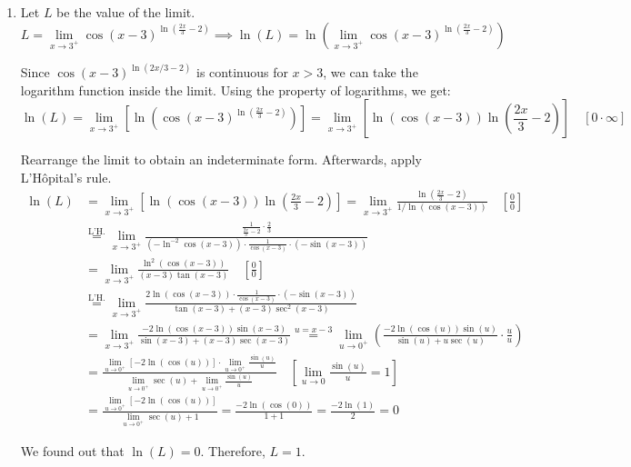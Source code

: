 \documentclass[a4paper, 12pt]{article}
\begin{document}
\begin{enumerate}[leftmargin=*,label=\textbf{\arabic*.}]
\item Let $L$ be the value of the limit.
\[L = \lim_{x\to3^+}\cos(x-3)^{\ln\left(\frac{2x}{3}-2\right)}\implies\ln(L) =\ln\left( \lim_{x\to3^+}\cos(x-3)^{\ln\left(\frac{2x}{3}-2\right)}\right)\]

Since $\cos(x-3)^{\ln(2x/3 -2)}$ is continuous for $x>3$, we can take the logarithm function inside the limit. Using the property of logarithms, we get:
\[\ln(L) =\lim_{x\to3^+}\left[ \ln\left(\cos(x-3)^{\ln\left(\frac{2x}{3}-2\right)}\right)\right] = \lim_{x\to3^+}\left[ \ln\left(\cos(x-3)\right)\ln\left(\frac{2x}{3}-2\right)\right]\quad[0 \cdot \infty]\]

Rearrange the limit to obtain an indeterminate form. Afterwards, apply L'Hôpital's rule.
\begin{align*}\ln(L)&=\lim_{x\to3^+}\left[ \ln\left(\cos(x-3)\right)\ln\left(\frac{2x}{3}-2\right)\right] = \lim_{x\to3^+}\frac{\ln\left(\frac{2x}{3}-2\right)}{1/ \ln\left(\cos(x-3)\right)} \quad \left[\frac00\right] \\[1em]&\overset{\text{L'H.}}{=} \lim_{x\to3^+}\frac{\displaystyle\frac1{\frac{2x}{3} - 2}\cdot \frac{2}{3}}{\displaystyle \left(-\ln^{-2}\displaystyle \cos(x-3)\right)\cdot \frac{1}{\cos(x-3)}\cdot(-\sin(x-3))}\\[1em]&= \lim_{x\to3^+} \displaystyle\frac{\ln^2(\cos(x-3))}{(x-3)\tan(x-3)} \quad\left[\frac00\right]\\[1em]&\overset{\text{L'H.}}{=} \lim_{x\to3^+} \frac{\displaystyle2\ln(\cos(x-3))\cdot\frac{1}{\cos(x-3)}\cdot(-\sin(x-3))}{\tan(x-3) + (x-3)\sec^2(x-3)}\\[1em]&=\lim_{x\to3^+}\frac{\displaystyle-2\ln(\cos(x-3))\sin(x-3)}{\sin(x-3) + (x-3)\sec(x-3)} \overset{u=x-3}{=} \lim_{u\to0^+}\left(\frac{\displaystyle-2\ln(\cos(u))\sin(u)}{\sin(u) + u\sec(u)} \cdot\frac{u}{u}\right)\\[1em]& = \frac{\displaystyle\lim_{u\to0^+}[-2\ln(\cos(u))]\cdot \lim_{u\to0^+}\frac{\sin(u)}{u}}{\displaystyle\lim_{u\to0^+}\sec(u)+\lim_{u\to0^+}\frac{\sin(u)}{u}}\quad \left[\lim_{u\to0} \frac{\sin(u)}u=1\right]\\[1em]&=\frac{\displaystyle\lim_{u\to0^+}[-2\ln(\cos(u))]}{\displaystyle\lim_{u\to0^+}\sec(u)+1}  =\frac{-2\ln(\cos(0))}{1+1} =\frac{-2\ln(1)}{2} = 0\end{align*}

We found out that $\ln(L) = 0$. Therefore, $\boxed{L = 1}$.


\end{enumerate}
\end{document}
